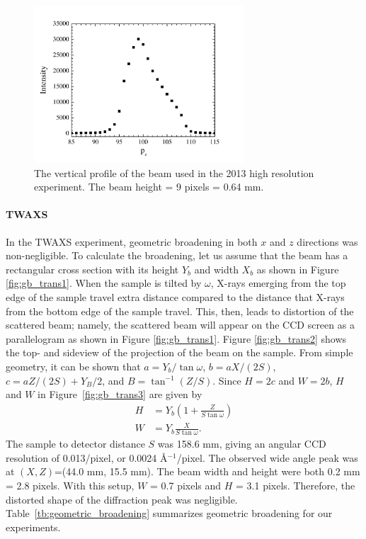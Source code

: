 \begin{figure}[htbp]
  \centering
  \includegraphics[width=0.7\textwidth]{figures/ripple/MMs/waxs/beamz_hr}
  \caption{The vertical profile of the beam used in the 2013 high resolution experiment.
  The beam height = 9 pixels = 0.64 mm.}
  \label{fig:NGIWAXS_beamz}
\end{figure} 

\paragraph{TWAXS}
In the TWAXS experiment, 
geometric broadening in both $x$ and $z$ directions was non-negligible.
To calculate the broadening, let us assume that the beam has a rectangular
cross section with its height $Y_b$ and width $X_b$ as shown in Figure 
\ref{fig:gb_trans1}. When the sample is tilted by $\omega$, X-rays emerging 
from the top edge of the sample travel extra distance compared to the distance 
that X-rays from the bottom edge of the sample travel. This, then, leads to 
distortion of the scattered beam; namely, the scattered beam will appear on 
the CCD screen as a parallelogram as shown in Figure 
\ref{fig:gb_trans1}. 
Figure \ref{fig:gb_trans2} shows the top- and sideview of the 
projection of the beam on the sample. From simple geometry, it can be shown 
that $a=Y_b/\tan\omega$, $b=aX/(2S)$, $c=aZ/(2S)+Y_B/2$, and $B=\tan^{-1}(Z/S)$. 
Since $H=2c$ and $W=2b$, $H$ and $W$ in Figure~\ref{fig:gb_trans3} are 
given by
\begin{align}
	H &= Y_b\left(1+\frac{Z}{S\tan\omega}\right)\\
	W &= Y_b\frac{X}{S\tan\omega}.
\end{align}
The sample to detector distance $S$ was 158.6 mm, giving an angular
CCD resolution of 0.013\textdegree/pixel, 
or 0.0024 \AA$^{-1}$/pixel.
The observed wide angle peak was at $(X,Z)$=(44.0 mm, 15.5 mm). 
The beam width and height were both 0.2 mm = 2.8 pixels.
With this setup, $W$ = 0.7 pixels and $H$ = 3.1 pixels. 
Therefore, the distorted shape of the diffraction peak was negligible.
Table~\ref{tb:geometric_broadening} summarizes geometric broadening for
our experiments.

